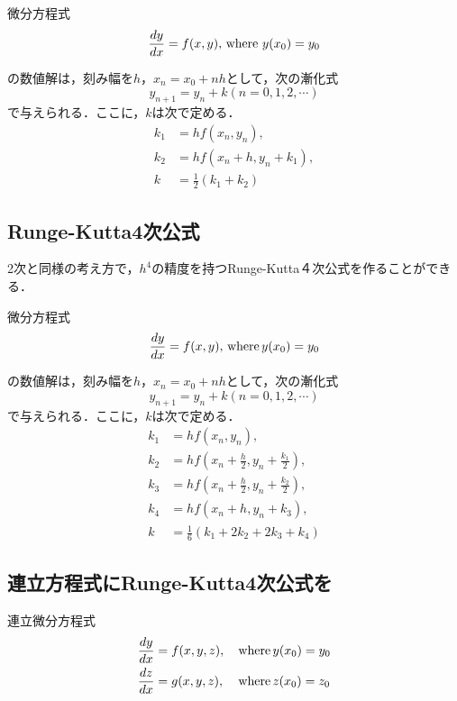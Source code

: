 \documentclass[11pt,dvipdfmx]{jsarticle}
\begin{document}
微分方程式 \[
\frac{dy}{dx} = f(x,y), \, {\rm where} \, \, y(x_0)=y_0
\]

の数値解は，刻み幅を\(h\)，\(x_n=x_0+nh\)として，次の漸化式 \[
y_{n+1} = y_n +k (n=0,1,2,\cdots)
\] で与えられる．ここに，\(k\)は次で定める． \[
\begin{aligned}
k_1 & = hf(x_n,y_n), \\
k_2 & = hf(x_n+h, y_n+k_1), \\
k & = \frac{1}{2}(k_1+k_2)
\end{aligned}
\]

    \subsection{Runge-Kutta4次公式}\label{runge-kutta4ux6b21ux516cux5f0f}

2次と同様の考え方で，\(h^4\)の精度を持つRunge-Kutta４次公式を作ることができる．

微分方程式 \[
\frac{dy}{dx} = f(x,y), \, {\rm where} \, y(x_0)=y_0
\]

の数値解は，刻み幅を\(h\)，\(x_n=x_0+nh\)として，次の漸化式 \[
y_{n+1} = y_n +k (n=0,1,2,\cdots)
\] で与えられる．ここに，\(k\)は次で定める． \[
\begin{aligned}
k_1 & = hf(x_n,y_n), \\
k_2 & = hf(x_n+\frac{h}{2}, y_n+\frac{k_1}{2}), \\
k_3 & = hf(x_n+\frac{h}{2}, y_n+\frac{k_2}{2}), \\
k_4 & = hf(x_n+h, y_n+k_3), \\
k & = \frac{1}{6}(k_1+2k_2+2k_3+k_4)
\end{aligned}
\]

    \subsection{連立方程式にRunge-Kutta4次公式を}\label{ux9023ux7acbux65b9ux7a0bux5f0fux306brunge-kutta4ux6b21ux516cux5f0fux3092}

連立微分方程式 \[
\begin{aligned}
\frac{dy}{dx} &= f(x,y,z), &\, {\rm where} &\, y(x_0)=y_0 \\
\frac{dz}{dx} &= g(x,y,z), &\, {\rm where} &\, z(x_0)=z_0 \\
\end{aligned}
\]
\end{document}
